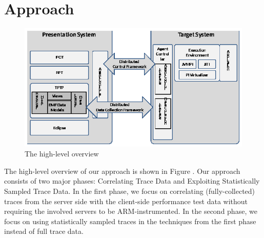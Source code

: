 \section{Approach}
\label{sec:approach}

\begin{figure}[t]
\centering
\includegraphics[scale=1.00,clip]{figs/approach.eps}
\caption{The high-level overview} \label{fig:omr}
\end{figure}

The high-level overview of our approach is shown in Figure .
Our approach consists of two major phases: Correlating Trace Data and Exploiting Statistically Sampled Trace Data.
In the first phase, we focus on correlating (fully-collected) traces from the server side with the client-side performance test data without requiring the involved servers to be ARM-instrumented.
In the second phase, we focus on using statistically sampled traces in the techniques from the first phase instead of full trace data.

